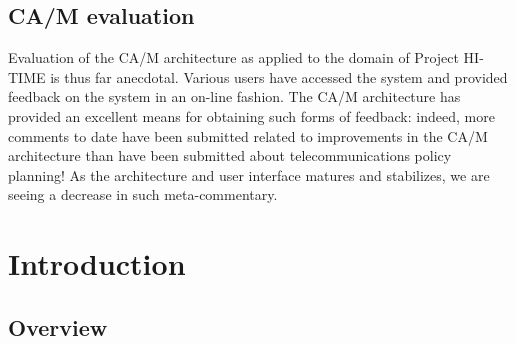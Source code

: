 \subsection{CA/M evaluation}

Evaluation of the CA/M architecture as applied to the domain of Project
HI-TIME is thus far anecdotal.  Various users have accessed the system and
provided feedback on the system in an on-line fashion.  The CA/M
architecture has provided an excellent means for obtaining such forms of
feedback: indeed, more comments to date have been submitted related to
improvements in the CA/M architecture than have been submitted about
telecommunications policy planning!  As the architecture and user interface
matures and stabilizes, we are seeing a decrease in such meta-commentary.

\appendix




\section{Introduction}

\subsection{Overview}

